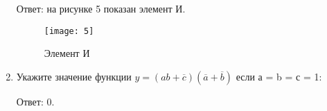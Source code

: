 \documentclass[spec, och, labwork]{shiza}
\begin{document}
\begin{enumerate}
    Ответ: на рисунке 5 показан элемент И.

    \begin{figure}[H]
        \centering      %
        \texttt{[image: 5]}
        \caption{Элемент И}
        \label{fig:image1}
    \end{figure}

    \item Укажите значение функции $y = (ab + \overline{c})(\overline{a} + \overline{b})$ если а = b = с = 1:
    
    Ответ: 0.
\end{enumerate}
\end{document}
